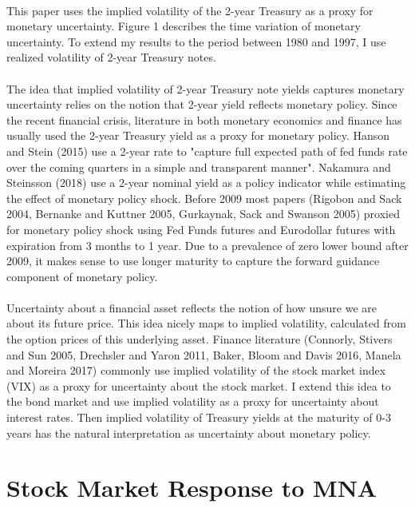 \documentclass[12pt]{article}
\begin{document}
\paragraph{}
This paper uses the implied volatility of the 2-year Treasury as a proxy for monetary uncertainty. Figure 1 describes the time variation of monetary uncertainty. To extend my results to the period between 1980 and 1997, I use realized volatility of 2-year Treasury notes.
\paragraph{}
The idea that implied volatility of 2-year Treasury note yields captures monetary uncertainty relies on the notion that 2-year yield reflects monetary policy. Since the recent financial crisis, literature in both monetary economics and finance has usually used the 2-year Treasury yield as a proxy for monetary policy. Hanson and Stein (2015) use a 2-year rate to "capture full expected path of fed funds rate over the coming quarters in a simple and transparent manner". Nakamura and Steinsson (2018) use a 2-year nominal yield as a policy indicator while estimating the effect of monetary policy shock. Before 2009 most papers (Rigobon and Sack 2004, Bernanke and Kuttner 2005, Gurkaynak, Sack and Swanson 2005) proxied for monetary policy shock using Fed Funds futures and Eurodollar futures with expiration from 3 months to 1 year. Due to a prevalence of zero lower bound after 2009, it makes sense to use longer maturity to capture the forward guidance component of monetary policy.
\paragraph{}
Uncertainty about a financial asset reflects the notion of how unsure we are about its future price. This idea nicely maps to implied volatility, calculated from the option prices of this underlying asset. Finance literature (Connorly, Stivers and Sun 2005, Drechsler and Yaron 2011, Baker, Bloom and Davis 2016, Manela and Moreira 2017) commonly use implied volatility of the stock market index (VIX) as a proxy for uncertainty about the stock market. I extend this idea to the bond market and use implied volatility as a proxy for uncertainty about interest rates. Then implied volatility of Treasury yields at the maturity of 0-3 years has the natural interpretation as uncertainty about monetary policy.

\section{Stock Market Response to MNA} \label{sec:Model}
\end{document}
